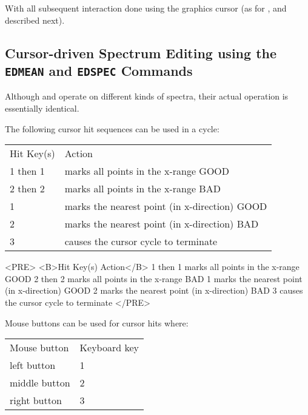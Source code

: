 With all subsequent interaction done using the graphics cursor (as for
, and described next)\@.


\subsection{Cursor-driven Spectrum Editing using the {\tt EDMEAN} and
{\tt EDSPEC} Commands}

Although  and
 operate on different kinds of spectra,
their actual operation is essentially identical.

The following cursor hit sequences can be used in a cycle:

\begin{latexonly}
\begin{tabular}{ll}
Hit Key(s) &  Action\\
1 then 1   &  marks all points in the x-range GOOD\\
2 then 2   &  marks all points in the x-range BAD\\
1          &  marks the nearest point (in x-direction) GOOD\\
2          &  marks the nearest point (in x-direction) BAD\\
3          &  causes the cursor cycle to terminate\\
\end{tabular}
\end{latexonly}

\begin{htmlonly}
\begin{rawhtml}
<PRE>
<B>Hit Key(s)   Action</B>
1 then 1     marks all points in the x-range GOOD
2 then 2     marks all points in the x-range BAD
   1         marks the nearest point (in x-direction) GOOD
   2         marks the nearest point (in x-direction) BAD
   3         causes the cursor cycle to terminate
</PRE>
\end{rawhtml}
\end{htmlonly}

Mouse buttons can be used for cursor hits where:

\begin{latexonly}
\begin{tabular}{ll}
Mouse button    & Keyboard key\\
left button     & 1\\
middle button   & 2\\
right button    & 3\\
\end{tabular}
\end{latexonly}

